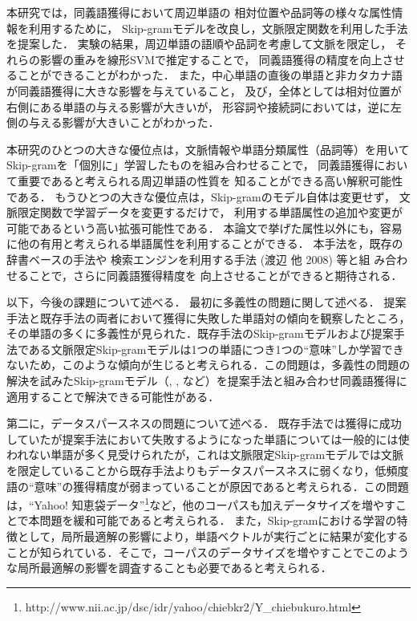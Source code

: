 \documentclass[japanese]{jnlp_1.4}
\begin{document}
本研究では，同義語獲得において周辺単語の
相対位置や品詞等の様々な属性情報を利用するために，
Skip-gramモデルを改良し，文脈限定関数を利用した手法を提案した．
実験の結果，周辺単語の語順や品詞を考慮して文脈を限定し，
それらの影響の重みを線形SVMで推定することで，
同義語獲得の精度を向上させることができることがわかった．
また，中心単語の直後の単語と非カタカナ語が同義語獲得に大きな影響を与えていること，
及び，全体としては相対位置が右側にある単語の与える影響が大きいが，
形容詞や接続詞においては，逆に左側の与える影響が大きいことがわかった．


本研究のひとつの大きな優位点は，文脈情報や単語分類属性（品詞等）を用いて
Skip-gramを「個別に」学習したものを組み合わせることで，
同義語獲得において重要であると考えられる周辺単語の性質を
知ることができる高い解釈可能性である．
もうひとつの大きな優位点は，Skip-gramのモデル自体は変更せず，
文脈限定関数で学習データを変更するだけで，
利用する単語属性の追加や変更が可能であるという高い拡張可能性である．
本論文で挙げた属性以外にも，容易に他の有用と考えられる単語属性を利用することができる．
本手法を，既存の辞書ベースの手法\cite{kato}や
    検索エンジンを利用する手法 (渡辺 他 2008) \nocite{watanabe}等と組
み合わせることで，さらに同義語獲得精度を
向上させることができると期待される．

以下，今後の課題について述べる．
最初に多義性の問題に関して述べる．
提案手法と既存手法の両者において獲得に失敗した単語対の傾向を観察したところ，
その単語の多くに多義性が見られた．既存手法のSkip-gramモデルおよび提案手法である文脈限定Skip-gramモデルは1つの単語につき1つの``意味''しか学習できないため，このような傾向が生じると考えられる．この問題は，多義性の問題の解決を試みたSkip-gramモデル（, , など）を提案手法と組み合わせ同義語獲得に適用することで解決できる可能性がある．

第二に，データスパースネスの問題について述べる．
既存手法では獲得に成功していたが提案手法において失敗するようになった単語については一般的には使われない単語が多く見受けられたが，これは文脈限定Skip-gramモデルでは文脈を限定していることから既存手法よりもデータスパースネスに弱くなり，低頻度語の``意味''の獲得精度が弱まっていることが原因であると考えられる．この問題は，``Yahoo! 知恵袋データ''\footnote{http://www.nii.ac.jp/dsc/idr/yahoo/chiebkr2/Y\_chiebukuro.html}など，他のコーパスも加えデータサイズを増やすことで本問題を緩和可能であると考えられる．
また，Skip-gramにおける学習の特徴として，局所最適解の影響により，単語ベクトルが実行ごとに結果が変化することが知られている\cite{suzuki}．そこで，コーパスのデータサイズを増やすことでこのような局所最適解の影響を調査することも必要であると考えられる．
\end{document}
